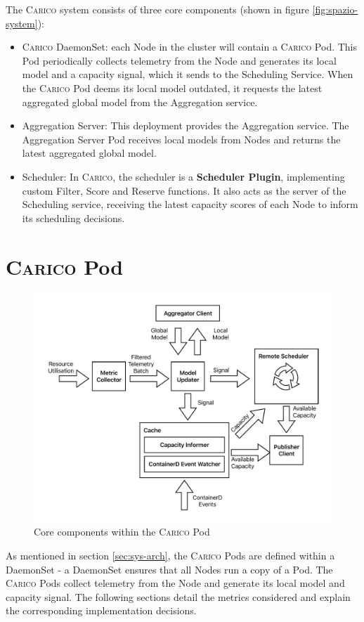 The \textsc{Carico} system consists of three core components (shown in figure
\ref{fig:spazio-system}):
\begin{itemize}
    \item \textsc{Carico} DaemonSet: each Node in the cluster will contain a \textsc{Carico} Pod.
        This Pod periodically collects telemetry from the Node and generates its
        local model and a capacity signal, which it sends to the Scheduling
        Service. When the \textsc{Carico} Pod deems its local model outdated, it requests
        the latest aggregated global model from the Aggregation service.
    \item Aggregation Server: This deployment provides the Aggregation service.
        The Aggregation Server Pod receives local models from Nodes
        and returns the latest aggregated global model.
    \item Scheduler: In \textsc{Carico}, the scheduler is a \textbf{Scheduler Plugin},
        implementing custom Filter, Score and Reserve functions. It also acts as
        the server of the Scheduling service, receiving the latest capacity
        scores of each Node to inform its scheduling decisions.
\end{itemize}

\section{\textsc{Carico} Pod}
\begin{figure}[H]
    \centering
    \includegraphics[width=\textwidth]{images/spazio-pod.pdf}
    \caption{Core components within the \textsc{Carico} Pod}
    \label{spazio-pod-components}
\end{figure}
As mentioned in section \ref{sec:sys-arch}, the \textsc{Carico} Pods are defined within a
DaemonSet - a DaemonSet ensures that all Nodes run a copy of a Pod. The \textsc{Carico}
Pods collect telemetry from the Node and generate its local model and capacity
signal. The following sections detail the metrics considered and explain the
corresponding implementation decisions.

